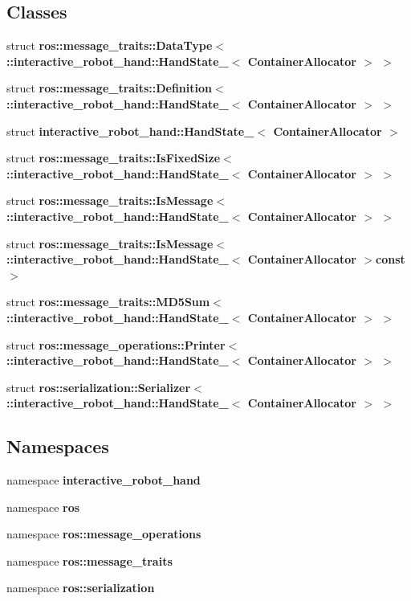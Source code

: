 \subsection*{Classes}
\begin{DoxyCompactItemize}
\item 
struct {\bf ros\-::message\-\_\-traits\-::\-Data\-Type$<$ \-::interactive\-\_\-robot\-\_\-hand\-::\-Hand\-State\-\_\-$<$ Container\-Allocator $>$ $>$}
\item 
struct {\bf ros\-::message\-\_\-traits\-::\-Definition$<$ \-::interactive\-\_\-robot\-\_\-hand\-::\-Hand\-State\-\_\-$<$ Container\-Allocator $>$ $>$}
\item 
struct {\bf interactive\-\_\-robot\-\_\-hand\-::\-Hand\-State\-\_\-$<$ Container\-Allocator $>$}
\item 
struct {\bf ros\-::message\-\_\-traits\-::\-Is\-Fixed\-Size$<$ \-::interactive\-\_\-robot\-\_\-hand\-::\-Hand\-State\-\_\-$<$ Container\-Allocator $>$ $>$}
\item 
struct {\bf ros\-::message\-\_\-traits\-::\-Is\-Message$<$ \-::interactive\-\_\-robot\-\_\-hand\-::\-Hand\-State\-\_\-$<$ Container\-Allocator $>$ $>$}
\item 
struct {\bf ros\-::message\-\_\-traits\-::\-Is\-Message$<$ \-::interactive\-\_\-robot\-\_\-hand\-::\-Hand\-State\-\_\-$<$ Container\-Allocator $>$const  $>$}
\item 
struct {\bf ros\-::message\-\_\-traits\-::\-M\-D5\-Sum$<$ \-::interactive\-\_\-robot\-\_\-hand\-::\-Hand\-State\-\_\-$<$ Container\-Allocator $>$ $>$}
\item 
struct {\bf ros\-::message\-\_\-operations\-::\-Printer$<$ \-::interactive\-\_\-robot\-\_\-hand\-::\-Hand\-State\-\_\-$<$ Container\-Allocator $>$ $>$}
\item 
struct {\bf ros\-::serialization\-::\-Serializer$<$ \-::interactive\-\_\-robot\-\_\-hand\-::\-Hand\-State\-\_\-$<$ Container\-Allocator $>$ $>$}
\end{DoxyCompactItemize}
\subsection*{Namespaces}
\begin{DoxyCompactItemize}
\item 
namespace {\bf interactive\-\_\-robot\-\_\-hand}
\item 
namespace {\bf ros}
\item 
namespace {\bf ros\-::message\-\_\-operations}
\item 
namespace {\bf ros\-::message\-\_\-traits}
\item 
namespace {\bf ros\-::serialization}
\end{DoxyCompactItemize}
